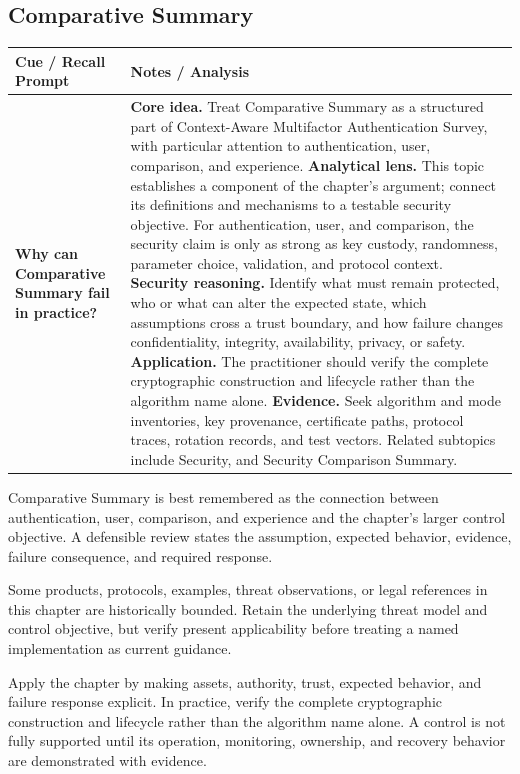 \documentclass[11pt]{article}
\newcommand{\CornellHeader}{%
\rowcolor{Navy}\color{white}\bfseries Cue / Recall Prompt & \color{white}\bfseries Notes / Analysis\\\hline}
\newcommand{\CornellRow}[2]{%
\cellcolor{CueGray}\RaggedRight\textbf{#1} & \RaggedRight #2\\\hline}
\begin{document}
\subsection*{Comparative Summary}
\begin{longtable}{>{\RaggedRight\arraybackslash}p{}|>{\RaggedRight\arraybackslash}p{}}
\CornellHeader
\CornellRow{Why can Comparative Summary fail in practice?}{\textbf{Core idea.} Treat Comparative Summary as a structured part of Context-Aware Multifactor Authentication Survey, with particular attention to authentication, user, comparison, and experience. \textbf{Analytical lens.} This topic establishes a component of the chapter's argument; connect its definitions and mechanisms to a testable security objective. For authentication, user, and comparison, the security claim is only as strong as key custody, randomness, parameter choice, validation, and protocol context. \textbf{Security reasoning.} Identify what must remain protected, who or what can alter the expected state, which assumptions cross a trust boundary, and how failure changes confidentiality, integrity, availability, privacy, or safety. \textbf{Application.} The practitioner should verify the complete cryptographic construction and lifecycle rather than the algorithm name alone. \textbf{Evidence.} Seek algorithm and mode inventories, key provenance, certificate paths, protocol traces, rotation records, and test vectors. Related subtopics include Security, and Security Comparison Summary.}
\end{longtable}
\begin{topicsummary}
Comparative Summary is best remembered as the connection between authentication, user, comparison, and experience and the chapter's larger control objective. A defensible review states the assumption, expected behavior, evidence, failure consequence, and required response.
\end{topicsummary}
\begin{historybox}
Some products, protocols, examples, threat observations, or legal references in this chapter are historically bounded. Retain the underlying threat model and control objective, but verify present applicability before treating a named implementation as current guidance.
\end{historybox}
\begin{defensebox}
Apply the chapter by making assets, authority, trust, expected behavior, and failure response explicit. In practice, verify the complete cryptographic construction and lifecycle rather than the algorithm name alone. A control is not fully supported until its operation, monitoring, ownership, and recovery behavior are demonstrated with evidence.
\end{defensebox}
\end{document}

